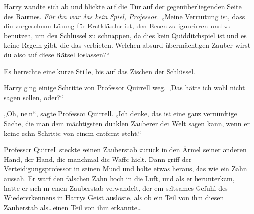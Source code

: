 Harry wandte sich ab und blickte auf die Tür auf der gegenüberliegenden Seite des Raumes.
\emph{Für ihn war das kein Spiel, Professor.}
„Meine Vermutung ist, dass die vorgesehene Lösung für Erstklässler ist, den Besen zu ignorieren und  zu benutzen, um den Schlüssel zu schnappen, da dies kein Quidditchspiel ist und es keine Regeln gibt, die das verbieten. Welchen absurd übermächtigen Zauber wirst du also auf diese Rätsel loslassen?“

Es herrschte eine kurze Stille, bis auf das Zischen der Schlüssel.

Harry ging einige Schritte von Professor Quirrell weg.
„Das hätte ich wohl nicht sagen sollen, oder?“

„Oh, nein“, sagte Professor Quirrell. „Ich denke, das ist eine ganz vernünftige Sache, die man dem mächtigsten dunklen Zauberer der Welt sagen kann, wenn er keine zehn Schritte von einem entfernt steht.“

Professor Quirrell steckte seinen Zauberstab zurück in den Ärmel seiner anderen Hand, der Hand, die manchmal die Waffe hielt.
Dann griff der Verteidigungsprofessor in seinen Mund und holte etwas heraus, das wie ein Zahn aussah. Er warf den falschen Zahn hoch in die Luft, und als er herunterkam, hatte er sich in einen Zauberstab verwandelt, der ein seltsames Gefühl des Wiedererkennens in Harrys Geist auslöste, als ob ein Teil von ihm diesen Zauberstab als…einen Teil von ihm erkannte…

